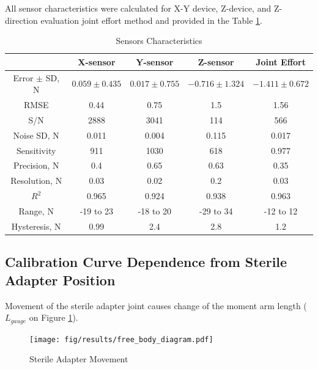 All sensor characteristics were calculated for X-Y device, Z-device, and Z-direction evaluation joint effort method and provided in the Table \ref{tab:SenChar}.

\begin{table}[h]
\caption {Sensors Characteristics} \label{tab:SenChar} 
\begin{center}
\begin{tabular}{ | c | c | c | c | c | } 
\hline
 &  X-sensor & Y-sensor & Z-sensor & Joint Effort \\ 
\hline
Error $\pm$ SD, N & $0.059 \pm 0.435$ & $0.017 \pm 0.755$ & $-0.716 \pm 1.324$ & $-1.411 \pm 0.672$ \\ 
\hline
RMSE & 0.44 & 0.75 & 1.5 & 1.56 \\ 
\hline
S/N & 2888 & 3041 & 114 & 566 \\
\hline
Noise SD, N & 0.011 & 0.004 & 0.115 & 0.017 \\
\hline
Sensitivity & 911 & 1030 & 618 & 0.977 \\
\hline
Precision, N & 0.4 & 0.65 & 0.63 & 0.35 \\
\hline
Resolution, N & 0.03 & 0.02 & 0.2 & 0.03 \\
\hline
$R^2$ & 0.965 & 0.924 & 0.938 & 0.963 \\
\hline
Range, N & -19 to 23 & -18 to 20 & -29 to 34 & -12 to 12 \\
\hline
Hysteresis, N & 0.99 & 2.4 & 2.8 & 1.2 \\
\hline
\end{tabular}
\end{center}
\end{table}

\subsection{Calibration Curve Dependence from Sterile Adapter Position}
	\label{sec:DisExp}
	
Movement of the sterile adapter joint causes change of the moment arm length ($L_{gauge}$ on Figure \ref{fig:Free_Body_Diagram}).	 	

\begin{figure}[h]
	\begin{center}
	\texttt{[image: fig/results/free\_body\_diagram.pdf]}
	\end{center}
	\vspace{-4mm}
	\caption[Sterile Adapter Movement]
	{Sterile Adapter Movement}
	\label{fig:Free_Body_Diagram}
	\vspace{-2mm}
\end{figure}

